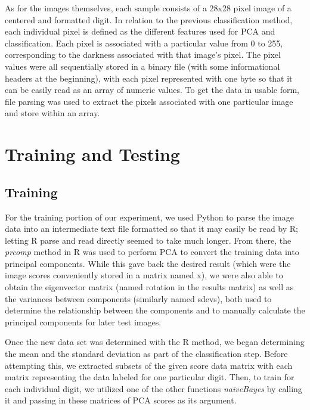 \documentclass[twocolumn]{article}
\begin{document}
As for the images themselves, each sample consists of a 28x28 pixel image of a centered and formatted digit. In relation to the previous classification method, each individual pixel is defined as the different features used for PCA and classification. Each pixel is associated with a particular value from 0 to 255, corresponding to the darkness associated with that image's pixel. The pixel values were all sequentially stored in a binary file (with some informational headers at the beginning), with each pixel represented with one byte so that it can be easily read as an array of numeric values. To get the data in usable form, file parsing was used to extract the pixels associated with one particular image and store within an array.

\section{Training and Testing} %
\subsection{Training} %
\label{subsec:training}
For the training portion of our experiment, we used Python to parse the image data into an intermediate text file formatted so that it may easily be read by R; letting R parse and read directly seemed to take much longer. From there, the \emph{prcomp} method in R was used to perform PCA to convert the training data into principal components. While this gave back the desired result (which were the image scores conveniently stored in a matrix named x), we were also able to obtain the eigenvector matrix (named rotation in the results matrix) as well as the variances between components (similarly named sdevs), both used to determine the relationship between the components and to manually calculate the principal components for later test images.

Once the new data set was determined with the R method, we began determining the mean and the standard deviation as part of the classification step. Before attempting this, we extracted subsets of the given score data matrix with each matrix representing the data labeled for one particular digit. Then, to train for each individual digit, we utilized one of the other functions \emph{naiveBayes} by calling it and passing in these matrices of PCA scores as its argument.
\end{document}
